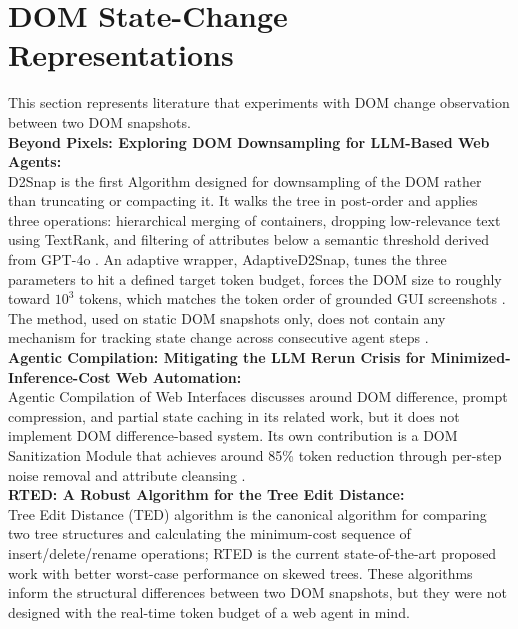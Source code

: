 \section{DOM State-Change Representations}
This section represents literature that experiments with DOM change observation between two DOM snapshots. \\
\textbf{Beyond Pixels: Exploring DOM Downsampling for LLM-Based Web Agents:}\\
D2Snap \cite{schiepanski2025d2snap} is the first Algorithm designed for downsampling of the DOM rather than truncating or compacting it. It walks the tree in post-order and applies three operations: hierarchical merging of containers, dropping low-relevance text using TextRank, and filtering of attributes below a semantic threshold derived from GPT-4o \cite{schiepanski2025d2snap}. An adaptive wrapper, AdaptiveD2Snap, tunes the three parameters to hit a defined target token budget, forces the DOM size to roughly toward $10^3$ tokens, which matches the token order of grounded GUI screenshots \cite{schiepanski2025d2snap}. The method, used on static DOM snapshots only, does not contain any mechanism for tracking state change across consecutive agent steps \cite{schiepanski2025d2snap}.\\
\textbf{Agentic Compilation: Mitigating the LLM Rerun Crisis for Minimized-Inference-Cost Web Automation:}\\
Agentic Compilation of Web Interfaces \cite{agenticcompilation2025} discusses around DOM difference, prompt compression, and partial state caching in its related work, but it does not implement DOM difference-based system. Its own contribution is a DOM Sanitization Module that achieves around 85\% token reduction through per-step noise removal and attribute cleansing \cite{agenticcompilation2025}.\\
\textbf{RTED: A Robust Algorithm for the Tree Edit Distance:}\\
Tree Edit Distance (TED) \cite{zhangshasha1989ted} algorithm is the canonical algorithm for comparing two tree structures and calculating the minimum-cost sequence of insert/delete/rename operations; RTED \cite{pawlik2011rted} is the current state-of-the-art proposed work with better worst-case performance on skewed trees. These algorithms inform the structural differences between two DOM snapshots, but they were not designed with the real-time token budget of a web agent in mind.\\


